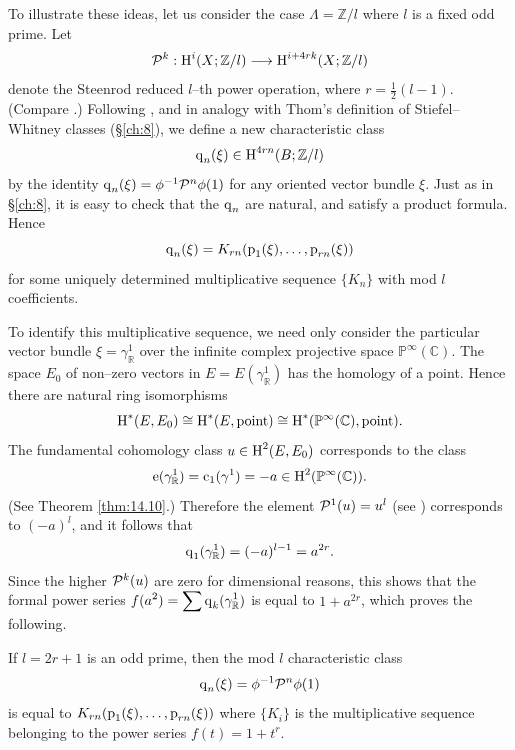 \documentclass[../main]{subfiles}
\begin{document}
To illustrate these ideas, let us consider the case $\Lambda = {\mathbb Z}/l$ where $l$ is a fixed odd prime. Let \[{\mathcal{P}}^k : \operatorname{H}^i(X; {\mathbb Z}/l) \longrightarrow \operatorname{H}^{i + 4rk} (X; {\mathbb Z}/l)\] denote the Steenrod reduced $l$--th power operation, where $r = \frac 1 2 (l - 1)$. (Compare \cite{steenrod1962cohomology}.) Following \cite{wu1955}, and in analogy with Thom's definition of Stiefel--Whitney classes (\S\ref{ch:8}), we define a new characteristic class \[\operatorname{q}_n(\xi) \in \operatorname{H}^{4rn}(B; {\mathbb Z}/l)\] by the identity $\operatorname{q}_n(\xi) = \phi^{-1} {\mathcal{P}}^n \phi(1)$ for any oriented vector bundle $\xi$. Just as in \S\ref{ch:8}, it is easy to check that the $\operatorname{q}_n$ are natural, and satisfy a product formula. Hence \[\operatorname{q}_n(\xi) = K_{rn}(\operatorname{p}_1(\xi), \ldots, \operatorname{p}_{rn}(\xi))\] for some uniquely determined multiplicative sequence $\{K_n\}$ with mod $l$ coefficients. 

To identify this multiplicative sequence, we need only consider the particular vector bundle $\xi = \gamma_{\mathbb R}^1$ over the infinite complex projective space ${\mathbb P}^\infty(\mathbb C)$. The space $E_0$ of non--zero vectors in $E = E(\gamma_{\mathbb R}^1)$ has the homology of a point. Hence there are natural ring isomorphisms \[\operatorname{H}^\ast(E, E_0) \cong \operatorname{H}^\ast(E, \text{point}) \cong \operatorname{H}^\ast({\mathbb P}^\infty(\mathbb C), \text{point}).\] The fundamental cohomology class $u \in \operatorname{H}^2(E, E_0)$ corresponds to the class \[\operatorname{e}(\gamma_{\mathbb R}^1) = \operatorname{c}_1(\gamma^1) = -a \in \operatorname{H}^2({\mathbb P}^\infty(\mathbb C)).\] 
(See Theorem \ref{thm:14.10}.) Therefore the element ${\mathcal{P}}^1(u) = u^l$ (see \cite[p. 76]{steenrod1962cohomology}) corresponds to $(-a)^l$, and it follows that \[\operatorname{q}_1(\gamma_{\mathbb R}^1) = (-a)^{l - 1} = a^{2r}.\] Since the higher ${\mathcal{P}}^k(u)$ are zero for dimensional reasons, this shows that the formal power series $\displaystyle f(a^2) = \sum \operatorname{q}_k(\gamma_{\mathbb R}^1)$ is equal to $1 + a^{2r}$, which proves the following.

\begin{theorem}[Wu]
If $l = 2r + 1$ is an odd prime, then the mod $l$ characteristic class \[\operatorname{q}_n(\xi) = \phi^{-1} {\mathcal{P}}^n \phi(1)\] is equal to $K_{rn}(\operatorname{p}_1(\xi), \ldots, \operatorname{p}_{rn}(\xi))$ where $\{K_i\}$ is the multiplicative sequence belonging to the power series $f(t) = 1 + t^r$. 
\end{theorem}
\end{document}
